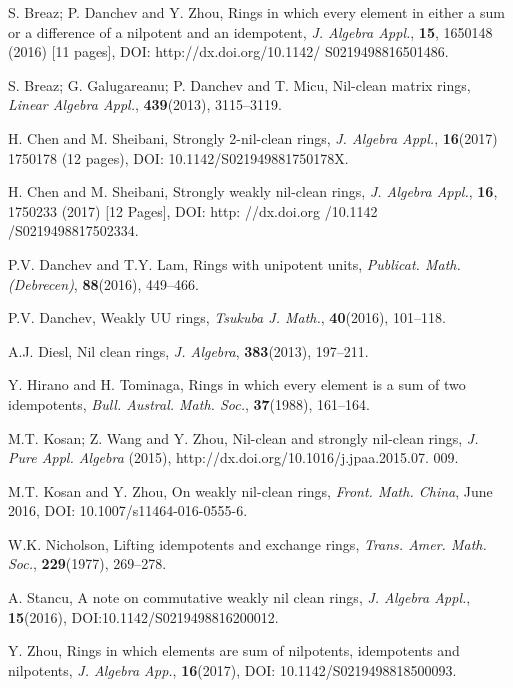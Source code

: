 \documentclass[12pt, reqno]{amsart}
\numberwithin{equation}{section}
\begin{document}
\vskip10mm\begin{thebibliography}{99}
 S. Breaz; P. Danchev and Y.
Zhou, Rings in which every element in either a sum or a difference of a nilpotent and an idempotent, {\it J. Algebra Appl.}, {\bf 15}, 1650148 (2016) [11 pages], DOI: http://dx.doi.org/10.1142/ S0219498816501486.

 S. Breaz; G. Galugareanu; P.
Danchev and T. Micu, Nil-clean matrix rings, {\it Linear Algebra
Appl.}, {\bf 439}(2013), 3115--3119.

 H. Chen and M. Sheibani, Strongly 2-nil-clean rings, {\it J. Algebra Appl.},
{\bf 16}(2017) 1750178 (12 pages), DOI: 10.1142/S021949881750178X.

 H. Chen and M. Sheibani, Strongly weakly nil-clean rings, {\it J. Algebra Appl.}, {\bf 16}, 1750233 (2017) [12 Pages],
DOI: http: //dx.doi.org /10.1142 /S0219498817502334.

 P.V. Danchev and T.Y. Lam, Rings with unipotent units, {\it Publicat. Math. (Debrecen)},
{\bf 88}(2016), 449--466.

 P.V. Danchev, Weakly UU rings, {\it Tsukuba J. Math.}, {\bf 40}(2016), 101--118.

 A.J. Diesl, Nil clean rings,
 {\it J. Algebra}, {\bf 383}(2013), 197--211.

 Y. Hirano and H. Tominaga,
Rings in which every element is a sum of two
idempotents, {\it Bull. Austral. Math. Soc.}, {\bf 37}(1988), 161--164.

 M.T. Kosan; Z. Wang and Y. Zhou, Nil-clean and strongly nil-clean rings, {\it J. Pure Appl. Algebra} (2015),
http://dx.doi.org/10.1016/j.jpaa.2015.07. 009.

 M.T. Kosan and Y. Zhou, On weakly nil-clean rings, {\it Front. Math. China}, June 2016, DOI: 10.1007/s11464-016-0555-6.

 W.K. Nicholson, Lifting
idempotents and exchange rings, {\it Trans. Amer. Math. Soc.}, {\bf
229}(1977), 269--278.

 A. Stancu, A note on commutative weakly nil clean rings,
 {\it J. Algebra Appl.}, {\bf 15}(2016), DOI:10.1142/S0219498816200012.

 Y. Zhou, Rings in which elements are sum of nilpotents, idempotents and nilpotents, {\it J. Algebra App.}, {\bf 16}(2017), DOI: 10.1142/S0219498818500093.
\end{thebibliography}
\end{document}
